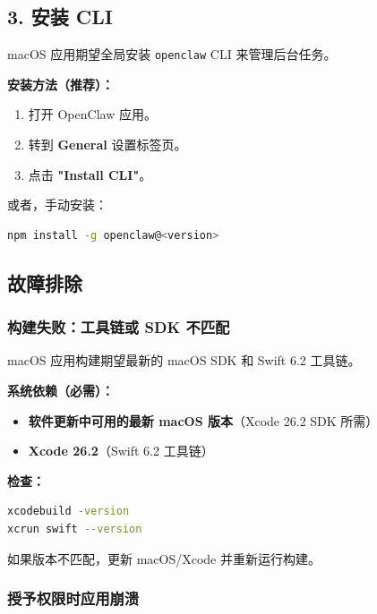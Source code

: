 \subsection{3. 安装 CLI}


macOS 应用期望全局安装 \texttt{openclaw} CLI 来管理后台任务。

\textbf{安装方法（推荐）：}

\begin{enumerate}
  \item 打开 OpenClaw 应用。
  \item 转到 \textbf{General} 设置标签页。
  \item 点击 \textbf{"Install CLI"}。
\end{enumerate}


或者，手动安装：

\begin{lstlisting}[language=bash]
npm install -g openclaw@<version>
\end{lstlisting}


\subsection{故障排除}


\subsubsection{构建失败：工具链或 SDK 不匹配}


macOS 应用构建期望最新的 macOS SDK 和 Swift 6.2 工具链。

\textbf{系统依赖（必需）：}

\begin{itemize}
  \item \textbf{软件更新中可用的最新 macOS 版本}（Xcode 26.2 SDK 所需）
  \item \textbf{Xcode 26.2}（Swift 6.2 工具链）
\end{itemize}


\textbf{检查：}

\begin{lstlisting}[language=bash]
xcodebuild -version
xcrun swift --version
\end{lstlisting}


如果版本不匹配，更新 macOS/Xcode 并重新运行构建。

\subsubsection{授予权限时应用崩溃}


